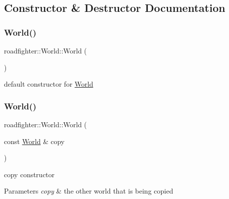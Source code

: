 \subsection{Constructor \& Destructor Documentation}
\mbox{\label{classroadfighter_1_1World_aa75df604422c5e2f160d082da86a50c4}} 
\subsubsection{\texorpdfstring{World()}{World()}\hspace{0.1cm}{\footnotesize\ttfamily [1/3]}}
{\footnotesize\ttfamily roadfighter\+::\+World\+::\+World (\begin{DoxyParamCaption}{ }\end{DoxyParamCaption})\hspace{0.3cm}{\ttfamily [default]}}

default constructor for \hyperlink{classroadfighter_1_1World}{World} \mbox{\label{classroadfighter_1_1World_aa2f34c06cc3b81a6cd3f862137f1786b}} 
\subsubsection{\texorpdfstring{World()}{World()}\hspace{0.1cm}{\footnotesize\ttfamily [2/3]}}
{\footnotesize\ttfamily roadfighter\+::\+World\+::\+World (\begin{DoxyParamCaption}\item[{const \hyperlink{classroadfighter_1_1World}{World} \&}]{copy }\end{DoxyParamCaption})\hspace{0.3cm}{\ttfamily [default]}}

copy constructor 
\begin{DoxyParams}{Parameters}
{\em copy} & the other world that is being copied \\
\hline
\end{DoxyParams}
\mbox{\label{classroadfighter_1_1World_aabd6663f3ee5533809152f154064cd89}} 

